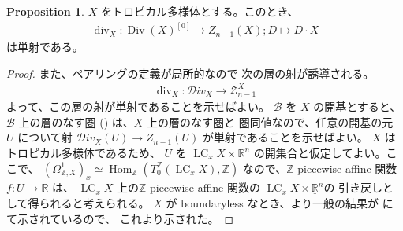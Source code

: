 \documentclass[a4paper,dvipdfmx,reqno,12pt]{amsart}
\theoremstyle{definition}
\newtheorem{proposition}[theorem]{Proposition}
\newcommand{\opn}[1]{\operatorname{#1}}
\numberwithin{equation}{section}
\begin{document}
\begin{proposition}
$X$ をトロピカル多様体とする。このとき、
\begin{align}
\opn{div}_X\colon
\opn{Div}(X)^{[0]}\to Z_{n-1}(X); D\mapsto D\cdot X    
\end{align}
は単射である。
\end{proposition}
\begin{proof}


また、ペアリングの定義が局所的なので
次の層の射が誘導される。
\begin{align}
\opn{div}_X\colon \mathcal{D}iv_X\to 
\mathscr{Z}_{n-1}^{X}
\end{align}
よって、この層の射が単射であることを示せばよい。
$\mathcal{B}$ を $X$ の開基とすると、
$\mathcal{B}$ 上の層のなす圏
(\cite[p.49-50]{MR2675155})
は、$X$ 上の層のなす圏と
圏同値なので、任意の開基の元 $U$ について射
$\mathcal{D}iv_X(U)\to Z_{n-1}(U)$
が単射であることを示せばよい。
$X$ はトロピカル多様体であるため、
$U$ を 
$\opn{LC}_x X\times \underline{\mathbb{R}}^{n}$
の開集合と仮定してよい。ここで、
$(\Omega_{\mathbb{Z},X}^{1})_{x}
\simeq \opn{Hom}_{\mathbb{Z}}
(T^{\mathbb{Z}}_0 (\opn{LC}_x X),\mathbb{Z})$
なので、$\mathbb{Z}$-piecewise affine 関数
$f\colon U\to \mathbb{R}$ は、
$\opn{LC}_x X$ 上の$\mathbb{Z}$-piecewise affine 関数の
$\opn{LC}_x X\times \underline{\mathbb{R}}^{n}$の
引き戻しとして得られると考えられる。
$X$ が boundaryless なとき、より一般の結果が
\cite[Theorem 4.5]{MR4246795} にて示されているので、
これより示された。
\end{proof}
\end{document}
